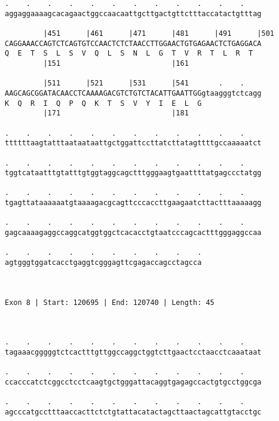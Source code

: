 \documentclass{article}
\begin{document}
\begin{Verbatim}
.    .    .    .    .    .    .    .    .    .    .    .    
aggaggaaaagcacagaactggccaacaattgcttgactgttctttaccatactgtttag
                                                            
         |451      |461      |471      |481      |491      |501
CAGGAAACCAGTCTCAGTGTCCAACTCTCTAACCTTGGAACTGTGAGAACTCTGAGGACA
Q  E  T  S  L  S  V  Q  L  S  N  L  G  T  V  R  T  L  R  T  
         |151                          |161                 
  
         |511      |521      |531      |541       .    .    
AAGCAGCGGATACAACCTCAAAAGACGTCTGTCTACATTGAATTGGgtaagggtctcagg
K  Q  R  I  Q  P  Q  K  T  S  V  Y  I  E  L  G              
         |171                          |181                 
  
.    .    .    .    .    .    .    .    .    .    .    .    
ttttttaagtatttaataataattgctggattccttatcttatagttttgccaaaaatct
                                                            
.    .    .    .    .    .    .    .    .    .    .    .    
tggtcataatttgtatttgtggtaggcagctttgggaagtgaattttatgagccctatgg
                                                            
.    .    .    .    .    .    .    .    .    .    .    .    
tgagttataaaaaatgtaaaagacgcagttcccaccttgaagaatcttactttaaaaagg
                                                            
.    .    .    .    .    .    .    .    .    .    .    .    
gagcaaaagaggccaggcatggtggctcacacctgtaatcccagcactttgggaggccaa
                                                            
.    .    .    .    .    .    .    .    .    .
agtgggtggatcacctgaggtcgggagttcgagaccagcctagcca
                                              
                                              
 
Exon 8 | Start: 120695 | End: 120740 | Length: 45



.    .    .    .    .    .    .    .    .    .    .    .    
tagaaacgggggtctcactttgttggccaggctggtcttgaactcctaacctcaaataat
                                                            
.    .    .    .    .    .    .    .    .    .    .    .    
ccacccatctcggcctcctcaagtgctgggattacaggtgagagccactgtgcctggcga
                                                            
.    .    .    .    .    .    .    .    .    .    .    .    
agcccatgcctttaaccacttctctgtattacatactagcttaactagcattgtacctgc
                                                            

\end{Verbatim}
\end{document}
